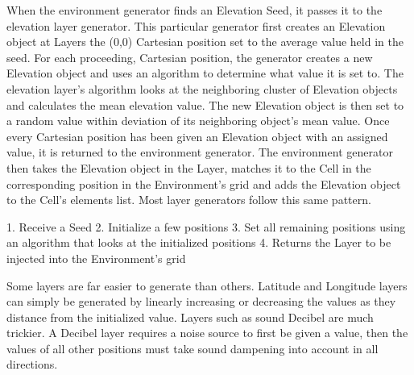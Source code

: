 When the environment generator finds an Elevation Seed, it passes it to the elevation layer generator.
This particular generator first creates an Elevation object at Layers the (0,0) Cartesian position set to the average value held in the seed.
For each proceeding, Cartesian position, the generator creates a new Elevation object and uses an algorithm to determine what value it is set to.
The elevation layer’s algorithm looks at the neighboring cluster of Elevation objects and calculates the mean elevation value.
The new Elevation object is then set to a random value within deviation of its neighboring object’s mean value.
Once every Cartesian position has been given an Elevation object with an assigned value, it is returned to the environment generator.
The environment generator then takes the Elevation object in the Layer, matches it to the Cell in the corresponding position in the Environment’s grid and adds the Elevation object to the Cell’s elements list.
Most layer generators follow this same pattern.

1.	Receive a Seed
2.	Initialize a few positions
3.	Set all remaining positions using an algorithm that looks at the initialized positions
4.	Returns the Layer to be injected into the Environment’s grid

Some layers are far easier to generate than others.
Latitude and Longitude layers can simply be generated by linearly increasing or decreasing the values as they distance from the initialized value.
Layers such as sound Decibel are much trickier.
A Decibel layer requires a noise source to first be given a value, then the values of all other positions must take sound dampening into account in all directions.

